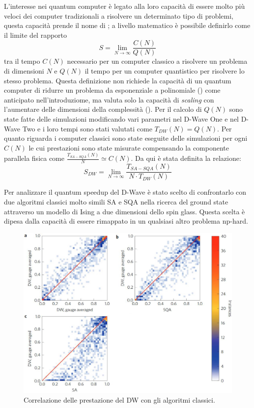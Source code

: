 
L'interesse nei quantum computer è legato alla loro capacità di essere molto più veloci dei computer tradizionali a risolvere un determinato tipo di problemi, questa capacità prende il nome di ; a livello matematico è possibile definirlo\cite{DDQS} come il limite del rapporto
$$S = \lim_{N \to \infty} \frac{C(N)}{Q(N)}$$
tra il tempo $C(N)$ necessario per un computer classico a risolvere un problema di dimensioni $N$ e $Q(N)$ il tempo per un computer quantistico per risolvere lo stesso problema. Questa definizione non richiede la capacità di un quantum computer di ridurre un problema da esponenziale a polinomiale () come anticipato nell'introduziome, ma valuta solo la capacità di \textit{scaling} con l'aumentare delle dimensioni della complessità ().
Per il calcolo di $Q(N)$ sono state fatte delle simulazioni modificando vari parametri nel D-Wave One e nel D-Wave Two e i loro tempi sono stati valutati come $T_{DW}(N) = Q(N)$. Per quanto riguarda i computer classici sono state eseguite delle simulazioni per ogni $C(N)$ le cui prestazioni sono state misurate compensando la componente parallela fisica\cite{EQA} come $\frac{T_{SA-SQA}(N)}{N} \simeq C(N)$.
Da qui è stata definita\cite{DDQS} la relazione:
$$S_{DW} = \lim_{N \to \infty} \frac{T_{SA-SQA}(N)}{N \cdot T_{DW}(N)}$$


\cite{EQA}Per analizzare il quantum speedup del D-Wave è stato scelto di confrontarlo con due algoritmi classici molto simili SA e SQA nella ricerca del ground state attraverso un modello di Ising a due dimensioni dello spin glass.
Questa scelta è dipesa dalla capacità di essere rimappato in un qualsiasi altro problema np-hard.

\begin{figure}[htbp]
  \centering
  \includegraphics[scale=0.5]{Immagini/correlazione-2-dw.jpg}
  \caption{Correlazione delle prestazione del DW con gli algoritmi classici.}
  \label{figura:correlazione-2-dw}
\end{figure}

